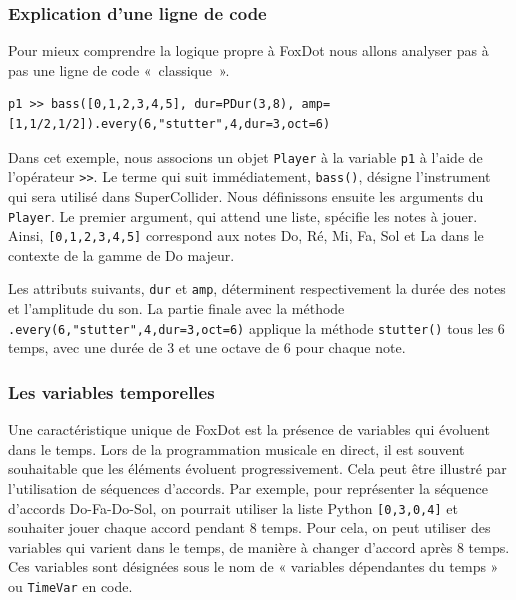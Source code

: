 \subsubsection*{Explication d'une ligne de code}
Pour mieux comprendre la logique propre à FoxDot nous allons analyser pas à pas une ligne de code «~classique~».

\begin{minipage}{\linewidth}
\begin{lstlisting}[caption=Exemple de base FoxDot,captionpos=b,frame=single]
p1 >> bass([0,1,2,3,4,5], dur=PDur(3,8), amp=[1,1/2,1/2]).every(6,"stutter",4,dur=3,oct=6)
\end{lstlisting}
\end{minipage}

Dans cet exemple, nous associons un objet \lstinline{Player}  à la variable \lstinline{p1} à l'aide de l'opérateur \lstinline{>>}. Le terme qui suit immédiatement, \lstinline{bass()}, désigne l'instrument qui sera utilisé dans SuperCollider. Nous définissons ensuite les arguments du \lstinline{Player}. Le premier argument, qui attend une liste, spécifie les notes à jouer. Ainsi, \lstinline{[0,1,2,3,4,5]} correspond aux notes Do, Ré, Mi, Fa, Sol et La dans le contexte de la gamme de Do majeur.


Les attributs suivants, \lstinline{dur} et \lstinline{amp}, déterminent respectivement la durée des notes et l'amplitude du son. La partie finale avec la méthode \lstinline{.every(6,"stutter",4,dur=3,oct=6)} applique la méthode \mbox{\lstinline{stutter()}} tous les 6 temps, avec une durée de 3 et une octave de 6 pour chaque note.


\subsubsection*{Les variables temporelles}

Une caractéristique unique de FoxDot est la présence de variables qui évoluent dans le temps. Lors de la programmation musicale en direct, il est souvent souhaitable que les éléments évoluent progressivement. Cela peut être illustré par l'utilisation de séquences d'accords. Par exemple, pour représenter la séquence d'accords Do-Fa-Do-Sol, on pourrait utiliser la liste Python \lstinline{[0,3,0,4]} et souhaiter jouer chaque accord pendant 8 temps. Pour cela, on peut utiliser des variables qui varient dans le temps, de manière à changer d'accord après 8 temps. Ces variables sont désignées sous le nom de « variables dépendantes du temps » ou \lstinline{TimeVar} en code.


